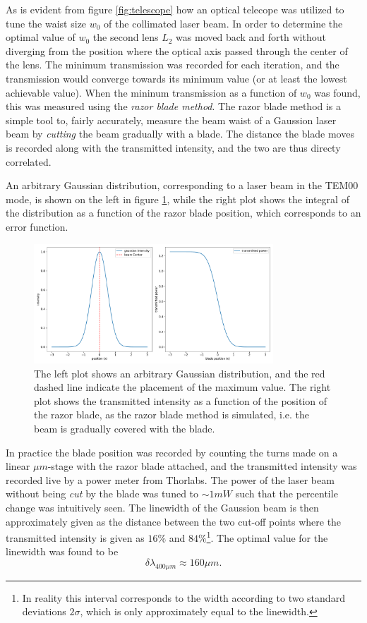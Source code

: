 As is evident from figure \ref{fig:telescope} how an optical telecope was utilized to tune the waist size $w_0$ of the collimated laser beam. In order to determine the optimal value of $w_0$ the second lens $L_2$ was moved back and forth without diverging from the position where the optical axis passed through the center of the lens. The minimum transmission was recorded for each iteration, and the transmission would converge towards its minimum value (or at least the lowest achievable value). When the mininum transmission as a function of $w_0$ was found, this was measured using the \emph{razor blade method}. The razor blade method is a simple tool to, fairly accurately, measure the beam waist of a Gaussion laser beam by \emph{cutting} the beam gradually with a blade. The distance the blade moves is recorded along with the transmitted intensity, and the two are thus directy correlated\cite{Forster}.

An arbitrary Gaussian distribution, corresponding to a laser beam in the TEM00 mode, is shown on the left in figure \ref{fig:razor_blade_method}, while the right plot shows the integral of the distribution as a function of the razor blade position, which corresponds to an error function. 

\begin{figure}[h!]
    \centering
    \includegraphics[width=0.8\textwidth]{figures/razor_blade_method.pdf}
    \caption{The left plot shows an arbitrary Gaussian distribution, and the red dashed line indicate the placement of the maximum value. The right plot shows the transmitted intensity as a function of the position of the razor blade, as the razor blade method is simulated, i.e. the beam is gradually covered with the blade.}
    \label{fig:razor_blade_method}
\end{figure}

In practice the blade position was recorded by counting the turns made on a linear $\mu m$-stage with the razor blade attached, and the transmitted intensity was recorded live by a power meter from Thorlabs. The power of the laser beam without being \emph{cut} by the blade was tuned to $\sim 1 mW$ such that the percentile change was intuitively seen. The linewidth of the Gaussion beam is then approximately given as the distance between the two cut-off points where the transmitted intensity is given as $16\%$ and $84\%$\footnote{In reality this interval corresponds to the width according to two standard deviations $2\sigma$, which is only approximately equal to the linewidth.}. The optimal value for the linewidth was found to be
\begin{equation}
    \delta \lambda_{400 \mu m} \approx 160 \mu m.
\end{equation}

